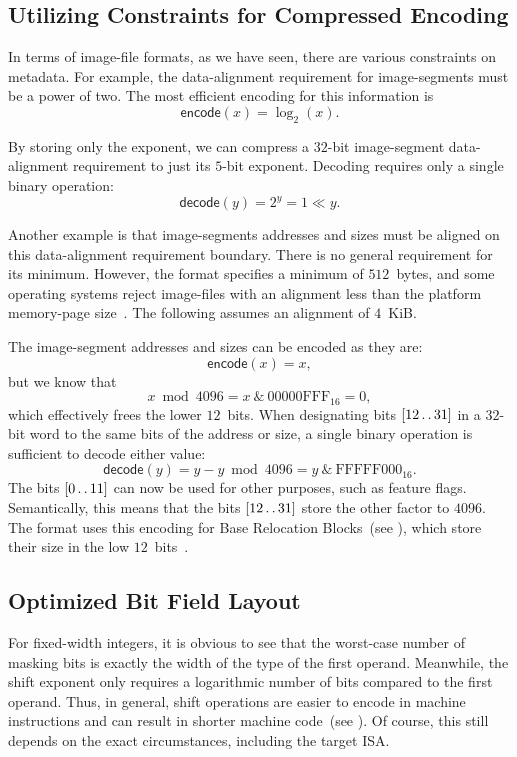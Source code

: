 \subsection{Utilizing Constraints for Compressed Encoding}
\label{sec:constr_packing}

In terms of \gls{image-file} formats, as we have seen, there are various constraints on metadata. For example, the \gls{data-alignment} requirement for \glspl{image-segment} must be a power of two. The most efficient encoding for this information is
\[ \mathsf{encode}(x) = \log_2(x). \]

By storing only the exponent, we can compress a $32$-bit \gls{image-segment} \gls{data-alignment} requirement to just its $5$-bit exponent. Decoding requires only a single binary operation:
\[ \mathsf{decode}(y) = 2^y = 1 \ll y. \]

Another example is that \glspl{image-segment} addresses and sizes must be aligned on this \gls{data-alignment} requirement boundary. There is no general requirement for its minimum. However, the  format specifies a minimum of $512$~\glspl{byte}, and some operating systems reject \glspl{image-file} with an alignment less than the platform \gls{memory-page} size~\cite{pe-format,xnu,linux}. The following assumes an alignment of $4$~KiB.

The \gls{image-segment} addresses and sizes can be encoded as they are:
\[ \mathsf{encode}(x) = x, \]
but we know that
\[ x\bmod 4096 = x~\&~\mathrm{00000FFF}_{16} = 0, \]
which effectively frees the lower $12$~bits. When designating bits $[12 \mathinner {\ldotp \ldotp} 31]$ in a $32$-bit word to the same bits of the address or size, a single binary operation is sufficient to decode either value:
\[ \mathsf{decode}(y) = y - y \bmod 4096 = y~\&~\mathrm{FFFFF000}_{16}. \]
The bits $[0 \mathinner {\ldotp \ldotp} 11]$ can now be used for other purposes, such as feature flags. Semantically, this means that the bits $[12 \mathinner {\ldotp \ldotp} 31]$ store the other factor to $4096$. The  format uses this encoding for Base Relocation Blocks~(see ), which store their size in the low $12$~bits~\cite{pe-format}.

\subsection{Optimized Bit Field Layout}

For fixed-width integers, it is obvious to see that the worst-case number of masking bits is exactly the width of the type of the first operand. Meanwhile, the shift exponent only requires a logarithmic number of bits compared to the first operand. Thus, in general, shift operations are easier to encode in machine instructions and can result in shorter machine code~(see ). Of course, this still depends on the exact circumstances, including the target \gls{ISA}.

